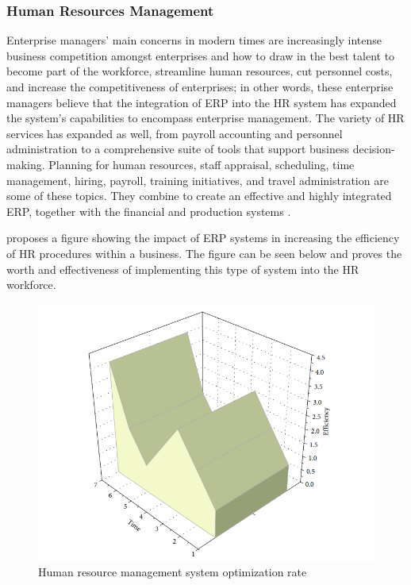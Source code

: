 \subsubsection{Human Resources Management}
\par{Enterprise managers' main concerns in modern times are increasingly intense business competition amongst enterprises and how to draw in the best talent to become part of the workforce, streamline human resources, cut personnel costs, and increase the competitiveness of enterprises; in other words, these enterprise managers believe that the integration of ERP into the HR system has expanded the system's capabilities to encompass enterprise management. The variety of HR services has expanded as well, from payroll accounting and personnel administration to a comprehensive suite of tools that support business decision-making. Planning for human resources, staff appraisal, scheduling, time management, hiring, payroll, training initiatives, and travel administration are some of these topics. They combine to create an effective and highly integrated ERP, together with the financial and production systems \citep{zhao2021research}.

\cite{zhao2021research} proposes a figure showing the impact of ERP systems in increasing the efficiency of HR procedures within a business. The figure can be seen below and proves the worth and effectiveness of implementing this type of system into the HR workforce.}
\begin{figure}[ht!]
    \centering
    \includegraphics[width=1\linewidth]{img/Human resource management system optimization rate..png}
    \caption{Human resource management system optimization rate}
    \label{fig:enter-label}
\end{figure}
